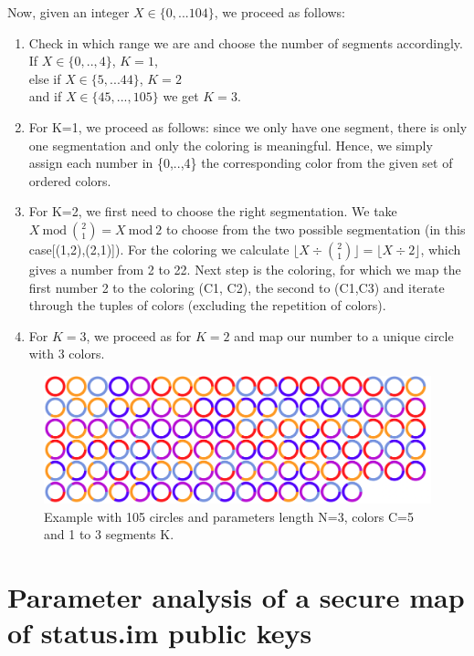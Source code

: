 \documentclass[a4paper,12pt]{article}
\begin{document}
Now, given an integer $X \in \{0,...104\}$, we proceed as follows:
\begin{enumerate}
    \item Check in which range we are and choose the number of segments accordingly.\\ If $X \in \{0,..,4\}$, $K=1$,\\ else if $X \in \{5, ... 44\}$, $K=2$\\ and if $X \in \{ 45, ..., 105\}$ we get $K=3$.
    \item For K=1, we proceed as follows: since we only have one segment, there is only one segmentation and only the coloring is meaningful. Hence, we simply assign each number in \{0,..,4\} the corresponding color from the given set of ordered colors.
    \item For K=2, we first need to choose the right segmentation. We take $X \ \text{mod} \ {2 \choose 1} = X \ \text{mod} \ 2$ to choose from the two possible segmentation (in this case[(1,2),(2,1)]). For the coloring we calculate $\lfloor X \div {2 \choose 1} \rfloor = \lfloor X \div 2 \rfloor $, which gives a number from 2 to 22. Next step is the coloring, for which we map the first number 2 to the coloring (C1, C2), the second to (C1,C3) and iterate through the tuples of colors (excluding the repetition of colors).
    \item For $K=3$, we proceed as for $K=2$ and map our number to a unique circle with 3 colors.
\end{enumerate}

\begin{figure}[h!]
    \centering
    \includegraphics[keepaspectratio, width = 12cm]{circles_example.png}
    \caption{Example with 105 circles and parameters length N=3, colors C=5 and 1 to 3 segments K.}
\end{figure}

\newpage
\section*{Parameter analysis of a secure map of status.im public keys}
\end{document}
